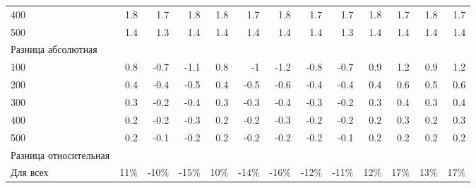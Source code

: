 \begin{sidewaystable}[p]
\begin{tabular}{@{}lrrrrrrrrrrrr@{}}
    400 & 1.8 & 1.7 & 1.8 & 1.8 & 1.7 & 1.8 & 1.7 & 1.7 & 1.8 & 1.7 & 1.8 & 1.7 \\
    500 & 1.4 & 1.3 & 1.4 & 1.4 & 1.4 & 1.4 & 1.4 & 1.3 & 1.4 & 1.4 & 1.4 & 1.4 \\
    Разница абсолютная &  &  &  &  &  &  &  &  &  &  &  &  \\
    100 & 0.8 & -0.7 & -1.1 & 0.8 & -1 & -1.2 & -0.8 & -0.7 & 0.9 & 1.2 & 0.9 & 1.2 \\
    200 & 0.4 & -0.4 & -0.5 & 0.4 & -0.5 & -0.6 & -0.4 & -0.4 & 0.4 & 0.6 & 0.5 & 0.6 \\
    300 & 0.3 & -0.2 & -0.4 & 0.3 & -0.3 & -0.4 & -0.3 & -0.2 & 0.3 & 0.4 & 0.3 & 0.4 \\
    400 & 0.2 & -0.2 & -0.3 & 0.2 & -0.2 & -0.3 & -0.2 & -0.2 & 0.2 & 0.3 & 0.2 & 0.3 \\
    500 & 0.2 & -0.1 & -0.2 & 0.2 & -0.2 & -0.2 & -0.2 & -0.1 & 0.2 & 0.2 & 0.2 & 0.2 \\
    Разница относительная &  &  &  &  &  &  &  &  &  &  &  &  \\
    Для всех & 11\% & -10\% & -15\% & 10\% & -14\% & -16\% & -12\% & -11\% & 12\% & 17\% & 13\% & 17\% \\

    
    \bottomrule
    \end{tabular}
    \\ 
\end{sidewaystable}







